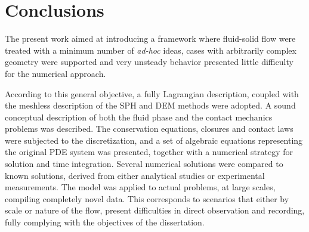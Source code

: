 \label{cap:conclusions}

\section{Conclusions}

The present work aimed at introducing a framework where fluid-solid flow were treated with a minimum number of \textit{ad-hoc} ideas, cases with arbitrarily complex geometry were supported and very unsteady behavior presented little difficulty for the numerical approach. 

According to this general objective, a fully Lagrangian description, coupled with the meshless description of the \ac{SPH} and \ac{DEM} methods were adopted. A sound conceptual description of both the fluid phase and the contact mechanics problems was described. The conservation equations, closures and contact laws were subjected to the discretization, and a set of algebraic equations representing the original \ac{PDE} system was presented, together with a numerical strategy for solution and time integration. Several numerical solutions were compared to known solutions, derived from either analytical studies or experimental measurements. The model was applied to actual problems, at large scales, compiling completely novel data. This corresponds to scenarios that either by scale or nature of the flow, present difficulties in direct observation and recording, fully complying with the objectives of the dissertation.\\

